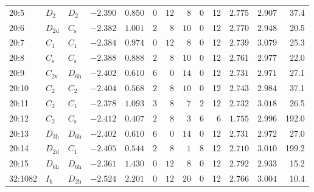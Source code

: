 \begin{table}[htbp]
{\begin{tabular}{lllrrrrrrrrrr}
    20:5    & $D_\mathrm{2}$  & $D_\mathrm{2 }$ & $-2.390$ & $0.850$  & $0$ & $12$ & $8$  & $0$ & 12 & $2.775$ & $2.907$ & 37.4  \\
    20:6    & $D_\mathrm{2d}$ & $C_\mathrm{s }$ & $-2.382$ & $1.001$  & $2$ & $8$  & $10$ & $0$ & 12 & $2.770$ & $2.948$ & 20.5  \\
    20:7    & $C_\mathrm{1}$  & $C_\mathrm{1 }$ & $-2.384$ & $0.974$  & $0$ & $12$ & $8$  & $0$ & 12 & $2.739$ & $3.079$ & 25.3  \\
    20:8    & $C_\mathrm{s}$  & $C_\mathrm{s }$ & $-2.388$ & $0.888$  & $2$ & $8$  & $10$ & $0$ & 12 & $2.761$ & $2.977$ & 22.0  \\
    20:9    & $C_\mathrm{2v}$ & $D_\mathrm{6h}$ & $-2.402$ & $0.610$  & $6$ & $0$  & $14$ & $0$ & 12 & $2.731$ & $2.971$ & 27.1  \\
    20:10   & $C_\mathrm{2}$  & $C_\mathrm{2 }$ & $-2.404$ & $0.568$  & $2$ & $8$  & $10$ & $0$ & 12 & $2.743$ & $2.984$ & 37.1  \\
    20:11   & $C_\mathrm{2}$  & $C_\mathrm{1}$  & $-2.378$ & $1.093$  & $3$ & $8$  & $7$  & $2$ & 12 & $2.732$ & $3.018$ & 26.5  \\
    20:12   & $C_\mathrm{2}$  & $C_\mathrm{s}$  & $-2.412$ & $0.407$  & $2$ & $8$  & $3$  & $6$ & 6  & $1.755$ & $2.996$ & 192.0 \\
    20:13   & $D_\mathrm{3h}$ & $D_\mathrm{6h}$ & $-2.402$ & $0.610$  & $6$ & $0$  & $14$ & $0$ & 12 & $2.731$ & $2.972$ & 27.0  \\
    20:14   & $D_\mathrm{2d}$ & $C_\mathrm{1}$  & $-2.405$ & $0.544$  & $2$ & $8$  & $1$  & $8$ & 12 & $2.710$ & $3.010$ & 199.2 \\
    20:15   & $D_\mathrm{6h}$ & $D_\mathrm{6h}$ & $-2.361$ & $1.430$  & $0$ & $12$ & $8$  & $0$ & 12 & $2.792$ & $2.933$ & 15.2  \\
    32:1082 & $I_\mathrm{h}$  & $D_\mathrm{2h}$ & $-2.524$ & $2.201$  & $0$ & $12$ & $20$ & $0$ & 12 & $2.766$ & $3.004$ & 10.4  \\
		\bottomrule
\end{tabular}}
\end{table}

